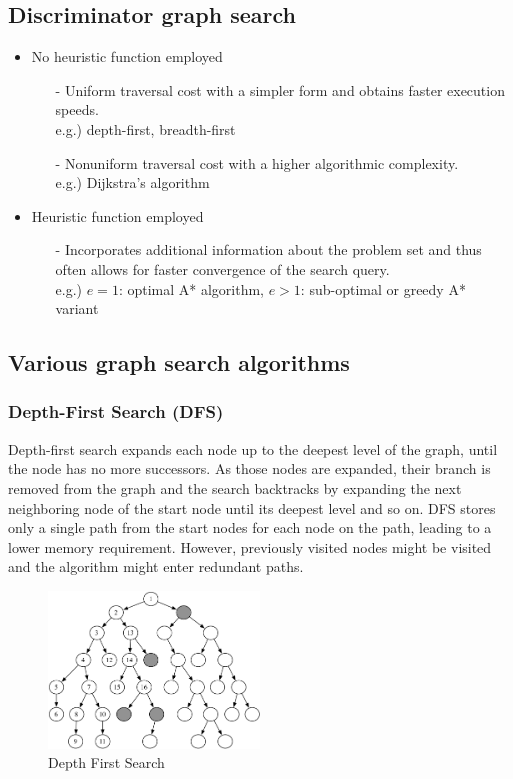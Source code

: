 \documentclass[twoside]{article}
\begin{document}
\subsection{Discriminator graph search}
\begin{itemize}

\item No heuristic function employed
    \begin{itemize}
    \item[-] Uniform traversal cost with a simpler form and obtains faster execution speeds. \\
    e.g.) depth-first, breadth-first \\
    \item[-] Nonuniform traversal cost with a higher algorithmic complexity.\\
    e.g.) Dijkstra’s algorithm
    \end{itemize}
    

\item Heuristic function employed 
    \begin{itemize}
    \item[-] Incorporates additional information about the problem set and thus often allows for faster convergence of the search query. \\
    e.g.) $e = 1$: optimal A* algorithm, $e > 1$: sub-optimal or greedy A* variant
\end{itemize}
\end{itemize}

\subsection{Various graph search algorithms}
\subsubsection{Depth-First Search (DFS)}
Depth-first search expands each node up to the deepest level of the graph, until the node has no more successors. As those nodes are expanded, their branch is removed from the graph and the search backtracks by expanding the next neighboring node of the start node until its deepest level and so on. DFS stores only a single path from the start nodes for each node on the path, leading to a lower memory requirement. However, previously visited nodes might be visited and the algorithm might enter redundant paths.

\begin{figure}[h!]
\begin{center}
\includegraphics[width=0.5\textwidth]{fig15_8.PNG}
\caption{Depth First Search}
\end{center}
\end{figure}
\end{document}
